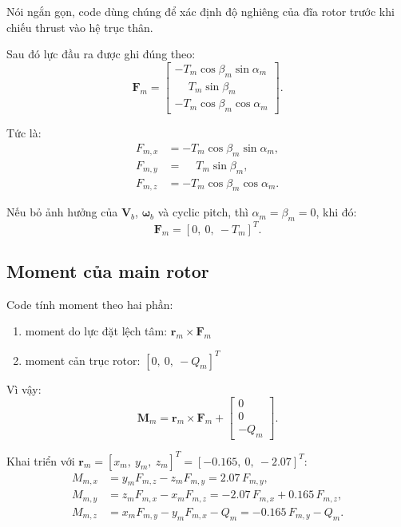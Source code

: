 \documentclass[11pt,a4paper]{article}
\newcommand{\vect}[1]{\boldsymbol{#1}}
\begin{document}
Nói ngắn gọn, code dùng chúng để xác định độ nghiêng của đĩa rotor trước khi
chiếu thrust vào hệ trục thân.

Sau đó lực đầu ra được ghi đúng theo:
\begin{equation}
  \vect{F}_m
  =
  \begin{bmatrix}
    -T_m\cos\beta_m\sin\alpha_m \\
    \phantom{-}T_m\sin\beta_m \\
    -T_m\cos\beta_m\cos\alpha_m
  \end{bmatrix}.
  \label{eq:main-force}
\end{equation}

Tức là:
\begin{align}
  F_{m,x} &= -T_m\cos\beta_m\sin\alpha_m, \\
  F_{m,y} &= \phantom{-}T_m\sin\beta_m, \\
  F_{m,z} &= -T_m\cos\beta_m\cos\alpha_m.
\end{align}

Nếu bỏ ảnh hưởng của \(\vect{V}_b\), \(\vect{\omega}_b\) và cyclic pitch,
thì \(\alpha_m=\beta_m=0\), khi đó:
\[
  \vect{F}_m = [0,\ 0,\ -T_m]^T.
\]

\subsection{Moment của main rotor}

Code tính moment theo hai phần:
\begin{enumerate}[leftmargin=1.8em]
  \item moment do lực đặt lệch tâm: \(\vect{r}_m \times \vect{F}_m\)
  \item moment cản trục rotor: \([0,\ 0,\ -Q_m]^T\)
\end{enumerate}

Vì vậy:
\begin{equation}
  \vect{M}_m
  =
  \vect{r}_m \times \vect{F}_m
  +
  \begin{bmatrix}
    0 \\ 0 \\ -Q_m
  \end{bmatrix}.
  \label{eq:main-moment}
\end{equation}

Khai triển với \(\vect{r}_m=[x_m,\ y_m,\ z_m]^T=[-0.165,\ 0,\ -2.07]^T\):
\begin{align}
  M_{m,x} &= y_m F_{m,z} - z_m F_{m,y} = 2.07\,F_{m,y}, \\
  M_{m,y} &= z_m F_{m,x} - x_m F_{m,z}
          = -2.07\,F_{m,x} + 0.165\,F_{m,z}, \\
  M_{m,z} &= x_m F_{m,y} - y_m F_{m,x} - Q_m
          = -0.165\,F_{m,y} - Q_m.
\end{align}
\end{document}
